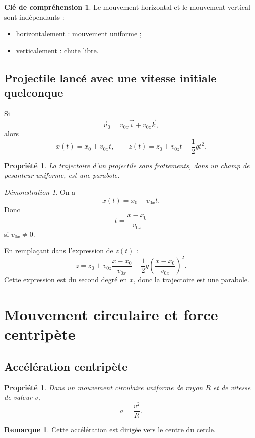\documentclass[11pt,a4paper]{article}
\theoremstyle{definition}
\newtheorem{remarque}[definition]{Remarque}
\newtheorem{interpretation}[definition]{Clé de compréhension}
\theoremstyle{plain}
\newtheorem{propriete}[definition]{Propriété}
\theoremstyle{remark}
\newtheorem*{demonstrationlibre}{Démonstration}
\begin{document}
\begin{interpretation}
Le mouvement horizontal et le mouvement vertical sont indépendants :
\begin{itemize}
    \item horizontalement : mouvement uniforme ;
    \item verticalement : chute libre.
\end{itemize}
\end{interpretation}

\subsection{Projectile lancé avec une vitesse initiale quelconque}

Si
\[
\vec{v}_0=v_{0x}\vec{i}+v_{0z}\vec{k},
\]
alors
\[
x(t)=x_0+v_{0x}t,\qquad z(t)=z_0+v_{0z}t-\frac12 gt^2.
\]

\begin{propriete}
La trajectoire d'un projectile sans frottements, dans un champ de pesanteur uniforme, est une parabole.
\end{propriete}

\begin{demonstrationlibre}
On a
\[
x(t)=x_0+v_{0x}t.
\]
Donc
\[
t=\frac{x-x_0}{v_{0x}}
\]
si $v_{0x}\neq 0$.

En remplaçant dans l'expression de $z(t)$ :
\[
z=z_0+v_{0z}\frac{x-x_0}{v_{0x}}-\frac12 g\left(\frac{x-x_0}{v_{0x}}\right)^2.
\]
Cette expression est du second degré en $x$, donc la trajectoire est une parabole.
\end{demonstrationlibre}

\section{Mouvement circulaire et force centripète}

\subsection{Accélération centripète}

\begin{propriete}
Dans un mouvement circulaire uniforme de rayon $R$ et de vitesse de valeur $v$,
\[
a=\frac{v^2}{R}.
\]
\end{propriete}

\begin{remarque}
Cette accélération est dirigée vers le centre du cercle.
\end{remarque}
\end{document}
